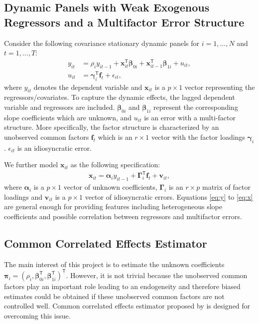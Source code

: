 \documentclass[11pt,a4paper]{article}
\newcommand{\Balpha}{\boldsymbol{\alpha}}
\newcommand{\Bbeta}{\boldsymbol{\beta}}
\newcommand{\Bgamma}{\boldsymbol{\gamma}}
\newcommand{\Bpi}{\boldsymbol{\pi}}
\newcommand{\BGamma}{\boldsymbol{\Gamma}}
\newcommand{\MBf}{\mathbf{f}}
\newcommand{\MBv}{\mathbf{v}}
\newcommand{\MBx}{\mathbf{x}}
\newcommand{\tp}{\mathsf{T}}
\theoremstyle{definition}
\begin{document}
\subsection{Dynamic Panels with Weak Exogenous Regressors and a Multifactor Error Structure}
Consider the following covariance stationary dynamic panels for $i=1,...,N$ and $t=1,...,T$:
\begin{align}
y_{it}&=\rho_iy_{it-1}+\MBx_{it}^{\tp}\Bbeta_{0i}+\MBx_{it-1}^{\tp}\Bbeta_{1i}+u_{it},\label{eq:y}\\
u_{it}&=\Bgamma_{i}^{\tp}\MBf_t+\epsilon_{it},\label{eq:u}
\end{align}
where $y_{it}$ denotes the dependent variable and $\MBx_{it}$ is a $p\times 1$ vector representing the regressors/covariates. To capture the dynamic effects, the lagged dependent variable and regressors are included. $\Bbeta_{0i}$ and $\Bbeta_{1i}$ represent  the corresponding slope coefficients which are unknown, and $u_{it}$ is an error with a multi-factor structure. More specifically, the factor structure is characterized by an unobserved common factors $\MBf_t$ which is an $r\times 1$ vector with the factor loadings $\Bgamma_i$. $\epsilon_{it}$ is an idiosyncratic error.

We further model $\MBx_{it}$ as the following specification:
\begin{align}
\MBx_{it}=\Balpha_iy_{it-1}+\BGamma_i^{\tp}\MBf_t+\MBv_{it}, \label{eq:x}
\end{align}
where $\Balpha_i$ is a $p\times 1$ vector of unknown coefficients, $\BGamma_i$ is an $r\times p$ matrix of factor loadings and $\MBv_{it}$ is a $p\times 1$ vector of idiosyncratic errors. Equations \eqref{eq:y} to \eqref{eq:x} are general enough for providing features including heterogeneous slope coefficients and possible correlation between regressors and multifactor errors.

\subsection{Common Correlated Effects Estimator}
The main interest of this project is to estimate the unknown coefficients $\Bpi_i=(\rho_i, \Bbeta_{0i}^{\tp}, \Bbeta_{1i}^{\tp})^{\tp}$. However, it is not trivial because the unobserved common factors play an important role leading to an endogeneity and therefore biased estimates could be obtained if these unobserved common factors are not controlled well. Common correlated effects estimator proposed by \cite{Chudik2015} is designed for overcoming this issue. 
\end{document}
